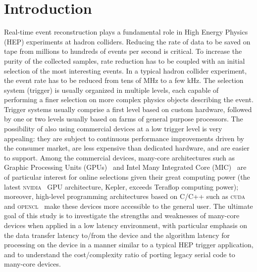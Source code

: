 \documentclass[a4]{jpconf}
\begin{document}
\section{Introduction}
Real-time event reconstruction plays a fundamental role in High Energy
Physics (HEP) experiments at hadron colliders.  Reducing the rate of
data to be saved on tape from millions to hundreds of events per
second is critical. To increase the purity of the collected samples,
rate reduction has to be coupled with an initial selection of the most
interesting events.  In a typical hadron collider experiment, the
event rate has to be reduced from tens of MHz to a few kHz.  The
selection system (trigger) is usually organized in multiple levels,
each capable of performing a finer selection on more complex physics
objects describing the event. Trigger systems usually comprise a first
level based on custom hardware, followed by one or two levels usually
based on farms of general purpose processors.  The possibility of also
using commercial devices at a low trigger level is very appealing:
they are subject to continuous performance improvements driven by the
consumer market, are less expensive than dedicated hardware, and are
easier to support.  Among the commercial devices, many-core architectures 
such as Graphic Processing Units (GPUs)~\cite{bib_gpu} and Intel Many
  Integrated Core (MIC)~\cite{bib_intelMIC} are of particular interest for 
online 
selections given their great computing power (the latest 
\textsc{nvidia}~\cite{bib_nvidia} GPU architecture, Kepler, exceeds Teraflop 
computing power); moreover,
high-level programming architectures based on C/C++ such as
\textsc{cuda}~\cite{bib_cuda}  and 
\textsc{opencl}~\cite{bib_opencl} make these devices more accessible to 
the general user.  The ultimate
goal of this study is to investigate the strengths and weaknesses of
many-core devices when applied in a low latency environment, with particular
emphasis on the data transfer latency to/from the device and the
algorithm latency for processing on the device in a manner similar to a
typical HEP trigger application, and to understand the cost/complexity
ratio of porting legacy serial code to many-core devices.
\end{document}

